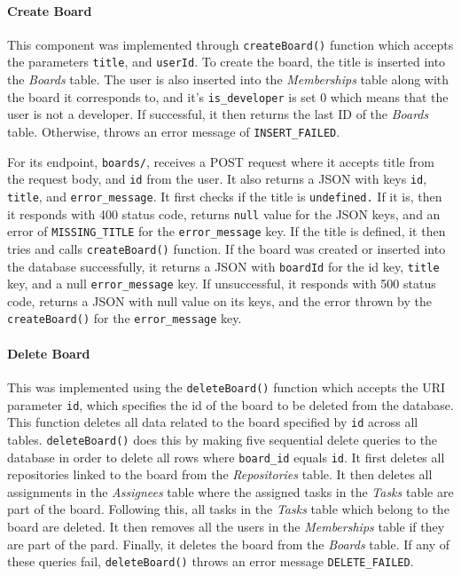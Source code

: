\documentclass{article}
\def\code#1{\texttt{#1}}
\begin{document}
\paragraph{Create Board}
This component was implemented through \code{createBoard()} function which
accepts the parameters \code{title}, and \code{userId}. To create the board, the
title is inserted into the \emph{Boards} table. The user is also inserted into
the \emph{Memberships} table along with the board it corresponds to, and it's
\code{is\_developer} is set 0 which means that the user is not a developer. If
successful, it then returns the last ID of the \emph{Boards} table. Otherwise,
throws an error message of \code{INSERT\_FAILED}.

For its endpoint, \code{boards/}, receives a POST request where it accepts title
from the request body, and \code{id} from the user. It also returns a JSON with
keys \code{id}, \code{title}, and \code{error\_message}. It first checks if the
title is \code{undefined.} If it is, then it responds with 400 status code,
returns \code{null} value for the JSON keys, and an error of
\code{MISSING\_TITLE} for the \code{error\_message} key. If the title is
defined, it then tries and calls \code{createBoard()} function. If the board was
created or inserted into the database successfully, it returns a JSON with
\code{boardId} for the id key, \code{title} key, and a null
\code{error\_message} key. If unsuccessful, it responds with 500 status code,
returns a JSON with null value on its keys, and the error thrown by the
\code{createBoard()} for the \code{error\_message} key.

\paragraph{Delete Board}
This was implemented using the \code{deleteBoard()} function which accepts the
URI parameter \code{id}, which specifies the id of the board to be deleted from
the database. This function deletes all data related to the board specified by
\code{id} across all tables. \code{deleteBoard()} does this by making five
sequential delete queries to the database in order to delete all rows where
\code{board\_id} equals \code{id}. It first deletes all repositories linked to
the board from the \emph{Repositories} table. It then deletes all assignments in
the \emph{Assignees} table where the assigned tasks in the \emph{Tasks} table
are part of the board. Following this, all tasks in the \emph{Tasks} table which
belong to the board are deleted. It then removes all the users in the
\emph{Memberships} table if they are part of the pard. Finally, it deletes the
board from the \emph{Boards} table. If any of these queries fail,
\code{deleteBoard()} throws an error message \code{DELETE\_FAILED}.
\end{document}
